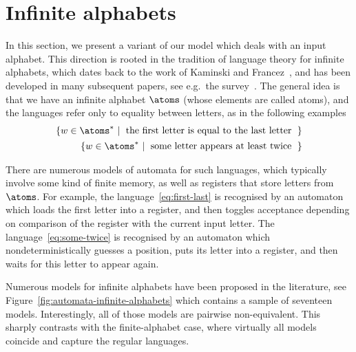 \section{Infinite alphabets}
\label{sec:infinite-alphabets}
\AP
In this section, we present a variant of our model which deals with an input
alphabet. This direction is rooted in the tradition of language theory for
infinite alphabets, which dates back to the work of Kaminski and
Francez~\cite{kaminskiFiniteMemoryAutomata1994}, and has been developed in many
subsequent papers, see e.g.~the
survey~\cite{bojanczykOrbitFiniteSetsTheir2017}. The general idea is that we
have an infinite alphabet $\atoms$ (whose elements are called atoms), and the
languages  refer only to equality between letters, as in the following examples
\begin{align}
\setbuild{ w \in \atoms^*}{the first letter is equal to the last letter}
\label{eq:first-last}
\\
\setbuild{ w \in \atoms^*}{some letter appears at least twice}
\label{eq:some-twice}
\end{align}

There are numerous models of automata for such languages, which typically
involve some kind of finite memory, as well as registers that store letters
from $\atoms$. For example, the language~\eqref{eq:first-last} is recognised by
an automaton which loads the first letter into a register, and then toggles
acceptance depending on comparison of the register with the current input
letter. The language~\eqref{eq:some-twice} is recognised by an automaton which
nondeterministically guesses a position, puts its letter into a register, and
then waits for this letter to appear again. 

Numerous models for infinite alphabets have been proposed in the literature,
see Figure~\ref{fig:automata-infinite-alphabets} which contains a sample of
seventeen models. Interestingly, all of those models are pairwise
non-equivalent. This sharply contrasts with the finite-alphabet case, where
virtually all models coincide and capture the regular languages. 

